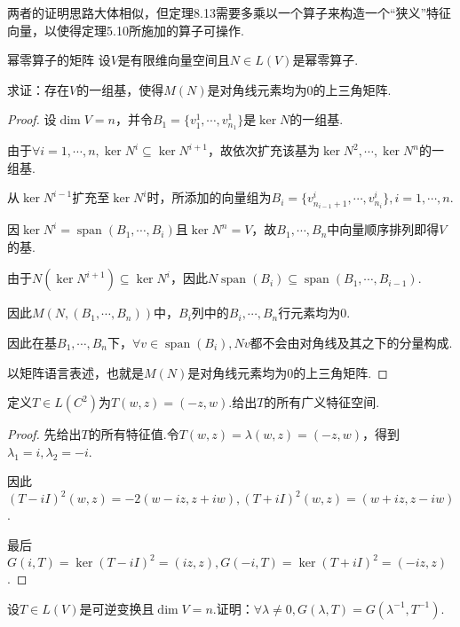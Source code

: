 {\kaishu 两者的证明思路大体相似，但定理8.13需要多乘以一个算子来构造一个“狭义”特征向量，以使得定理5.10所施加的算子可操作.}

\begin{theorem}[8.19]\label{thm 8.19} 幂零算子的矩阵 \:
    设\(V\)是有限维向量空间且\(N \in L(V)\)是幂零算子.

    求证：存在\(V\)的一组基，使得\(M(N)\)是对角线元素均为\(0\)的上三角矩阵.
\end{theorem}

\begin{proof}
    设\(\dim V=n\)，并令\(B_1=\{v_1^1,\cdots,v_{n_1}^1\}\)是\(\ker N\)的一组基.

    由于\(\forall i=1,\cdots,n,\ker N^i \subseteq \ker N^{i+1}\)，故依次扩充该基为\(\ker N^2,\cdots,\ker N^n\)的一组基.
    
    从\(\ker N^{i-1}\)扩充至\(\ker N^i\)时，所添加的向量组为\(B_i=\{v_{n_{i-1}+1}^i,\cdots,v_{n_i}^i\},i=1,\cdots,n\).
    
    因\(\ker N^i=\operatorname{span}(B_1,\cdots,B_i)\)且\(\ker N^n=V\)，故\(B_1,\cdots,B_n\)中向量顺序排列即得\(V\)的基.
    
    由于\(N(\ker N^{i+1}) \subseteq \ker N^i\)，因此\(N \operatorname{span}(B_i) \subseteq \operatorname{span}(B_1,\cdots,B_{i-1})\).
    
    因此\(M(N,(B_1,\cdots,B_n))\)中，\(B_i\)列中的\(B_i,\cdots,B_n\)行元素均为\(0\).
    
    因此在基\(B_1,\cdots,B_n\)下，\(\forall v \in \operatorname{span}(B_i),Nv\)都不会由对角线及其之下的分量构成.
    
    以矩阵语言表述，也就是\(M(N)\)是对角线元素均为\(0\)的上三角矩阵.
\end{proof}

\newpage

\begin{problem}[2]\label{8.A.2}
    定义\(T \in L(C^2)\)为\(T(w,z)=(-z,w)\).给出\(T\)的所有广义特征空间.
\end{problem}

\begin{proof}
    先给出\(T\)的所有特征值.令\(T(w,z)=\lambda(w,z)=(-z,w)\)，得到\(\lambda_1=i,\lambda_2=-i\).

    因此\((T-iI)^2(w,z)=-2(w-iz,z+iw),(T+iI)^2(w,z)=(w+iz,z-iw)\).
    
    最后\(G(i,T)=\ker (T-iI)^2=(iz,z),G(-i,T)=\ker (T+iI)^2=(-iz,z)\).
\end{proof}

\begin{problem}[3]\label{8.A.3}
    设\(T \in L(V)\)是可逆变换且\(\dim V=n\).证明：\(\forall \lambda \ne 0,G(\lambda,T)=G(\lambda^{-1},T^{-1})\).
\end{problem}

